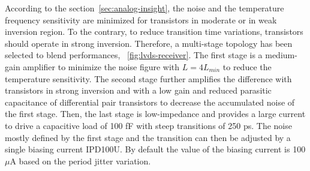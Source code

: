 According to the section~\ref{sec:analog-insight}, the noise and the temperature frequency sensitivity are minimized for transistors in moderate or in weak inversion region. To the contrary, to reduce transition time variations, transistors should operate in strong inversion. Therefore, a multi-stage topology has been selected to blend performances, \figurename~\ref{fig:lvds-receiver}. The first stage is a medium-gain amplifier to minimize the noise figure with $L=4L_{min}$ to reduce the temperature sensitivity. The second stage further amplifies the difference with transistors in strong inversion and with a low gain and reduced parasitic capacitance of differential pair transistors to decrease the accumulated noise of the first stage. Then, the last stage is low-impedance and provides a large current to drive a capacitive load of 100 fF with steep transitions of 250 ps. The noise mostly defined by the first stage and the transition can then be adjusted by a single biasing current IPD100U. By default the value of the biasing current is 100 $\mu$A based on the period jitter variation.

